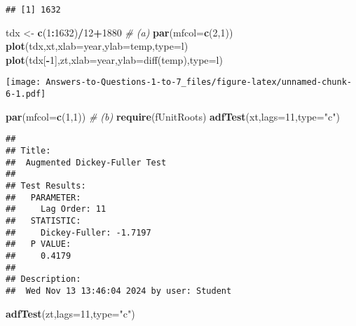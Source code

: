 \documentclass[
]{article}
\newenvironment{Shaded}{\begin{snugshade}}{\end{snugshade}}
\newcommand{\AttributeTok}[1]{\textcolor[rgb]{0.13,0.29,0.53}{#1}}
\newcommand{\CommentTok}[1]{\textcolor[rgb]{0.56,0.35,0.01}{\textit{#1}}}
\newcommand{\DecValTok}[1]{\textcolor[rgb]{0.00,0.00,0.81}{#1}}
\newcommand{\FunctionTok}[1]{\textcolor[rgb]{0.13,0.29,0.53}{\textbf{#1}}}
\newcommand{\NormalTok}[1]{#1}
\newcommand{\OtherTok}[1]{\textcolor[rgb]{0.56,0.35,0.01}{#1}}
\newcommand{\SpecialCharTok}[1]{\textcolor[rgb]{0.81,0.36,0.00}{\textbf{#1}}}
\newcommand{\StringTok}[1]{\textcolor[rgb]{0.31,0.60,0.02}{#1}}
\begin{document}
\begin{verbatim}
## [1] 1632
\end{verbatim}

\begin{Shaded}
\begin{Highlighting}[]
\NormalTok{tdx }\OtherTok{\textless{}{-}} \FunctionTok{c}\NormalTok{(}\DecValTok{1}\SpecialCharTok{:}\DecValTok{1632}\NormalTok{)}\SpecialCharTok{/}\DecValTok{12}\SpecialCharTok{+}\DecValTok{1880}
\CommentTok{\# (a)}
\FunctionTok{par}\NormalTok{(}\AttributeTok{mfcol=}\FunctionTok{c}\NormalTok{(}\DecValTok{2}\NormalTok{,}\DecValTok{1}\NormalTok{))}
\FunctionTok{plot}\NormalTok{(tdx,xt,}\AttributeTok{xlab=}\StringTok{\textquotesingle{}year\textquotesingle{}}\NormalTok{,}\AttributeTok{ylab=}\StringTok{\textquotesingle{}temp\textquotesingle{}}\NormalTok{,}\AttributeTok{type=}\StringTok{\textquotesingle{}l\textquotesingle{}}\NormalTok{)}
\FunctionTok{plot}\NormalTok{(tdx[}\SpecialCharTok{{-}}\DecValTok{1}\NormalTok{],zt,}\AttributeTok{xlab=}\StringTok{\textquotesingle{}year\textquotesingle{}}\NormalTok{,}\AttributeTok{ylab=}\StringTok{\textquotesingle{}diff(temp)\textquotesingle{}}\NormalTok{,}\AttributeTok{type=}\StringTok{\textquotesingle{}l\textquotesingle{}}\NormalTok{)}
\end{Highlighting}
\end{Shaded}

\texttt{[image: Answers-to-Questions-1-to-7\_files/figure-latex/unnamed-chunk-6-1.pdf]}

\begin{Shaded}
\begin{Highlighting}[]
\FunctionTok{par}\NormalTok{(}\AttributeTok{mfcol=}\FunctionTok{c}\NormalTok{(}\DecValTok{1}\NormalTok{,}\DecValTok{1}\NormalTok{))}
\CommentTok{\# (b)}
\FunctionTok{require}\NormalTok{(fUnitRoots)}
\FunctionTok{adfTest}\NormalTok{(xt,}\AttributeTok{lags=}\DecValTok{11}\NormalTok{,}\AttributeTok{type=}\StringTok{"c"}\NormalTok{)}
\end{Highlighting}
\end{Shaded}

\begin{verbatim}
## 
## Title:
##  Augmented Dickey-Fuller Test
## 
## Test Results:
##   PARAMETER:
##     Lag Order: 11
##   STATISTIC:
##     Dickey-Fuller: -1.7197
##   P VALUE:
##     0.4179 
## 
## Description:
##  Wed Nov 13 13:46:04 2024 by user: Student
\end{verbatim}

\begin{Shaded}
\begin{Highlighting}[]
\FunctionTok{adfTest}\NormalTok{(zt,}\AttributeTok{lags=}\DecValTok{11}\NormalTok{,}\AttributeTok{type=}\StringTok{"c"}\NormalTok{)}
\end{Highlighting}
\end{Shaded}
\end{document}
